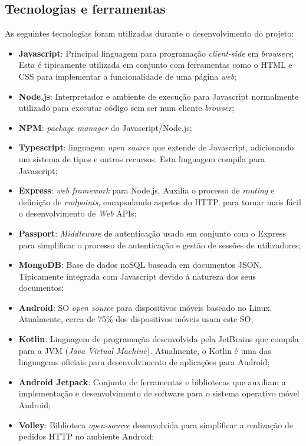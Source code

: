 \subsection{Tecnologias e ferramentas}
As seguintes tecnologias foram utilizadas durante o desenvolvimento do projeto:
\begin{itemize}
	\item \textbf{Javascript}: Principal linguagem para programação \textit{client-side} em \textit{browsers}; Esta é tipicamente utilizada em conjunto com ferramentas como o HTML e CSS para implementar a funcionalidade de uma página \textit{web};
	\item \textbf{Node.js}: Interpretador e ambiente de execução para Javascript normalmente utilizado para executar código sem ser num cliente \textit{browser};
	\item \textbf{NPM}: \textit{package manager} do Javascript/Node.js;
	\item \textbf{Typescript}: linguagem \textit{open source} que extende de Javascript, adicionando um sistema de tipos e outros recursos. Esta linguagem compila para Javascript;
	\item \textbf{Express}: \textit{web framework} para Node.js. Auxilia o processo de \textit{routing} e definição de \textit{endpoints}, encapsulando aspetos do HTTP, para tornar mais fácil o desenvolvimento de \textit{Web} APIs;
	\item \textbf{Passport}: \textit{Middleware} de autenticação usado em conjunto com o Express para simplificar o processo de autenticação e gestão de sessões de utilizadores;
	\item \textbf{MongoDB}: Base de dados noSQL baseada em documentos JSON. Tipicamente integrada com Javascript devido à natureza dos seus documentos;
	\item \textbf{Android}: SO \textit{open source} para dispositivos móveis baseado no Linux. Atualmente, cerca de 75\% dos dispositivos móveis usam este SO;
	\item \textbf{Kotlin}: Linguagem de programação desenvolvida pela JetBrains que compila para a JVM (\textit{Java Virtual Machine}). Atualmente, o Kotlin é uma das linguagems oficiais para desenvolvimento de aplicações para Android;
	\item \textbf{Android Jetpack}: Conjunto de ferramentas e bibliotecas que auxiliam a implementação e desenvolvimento de software para o sistema operativo móvel Android;
	\item \textbf{Volley}: Biblioteca \textit{open-source} desenvolvida para simplificar a realização de pedidos HTTP no ambiente Android;

\end{itemize}
